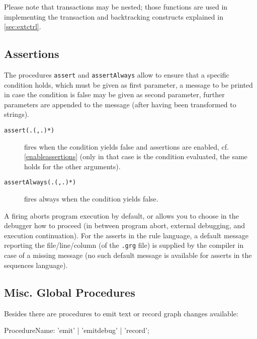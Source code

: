 Please note that transactions may be nested; those functions are used in implementing the transaction and backtracking constructs explained in \ref{sec:extctrl}.


\subsection{Assertions}\label{sec:assert}

The procedures \texttt{assert} and \texttt{assertAlways} allow to ensure that a specific condition holds, which must be given as first parameter, a message to be printed in case the condition is false may be given as second parameter, further parameters are appended to the  message (after having been transformed to strings).

\begin{description}
\item[\texttt{assert(.(,.)*)}] fires when the condition yields false and assertions are enabled, cf. \ref{enableassertions} (only in that case is the condition evaluated, the same holds for the other arguments).
\item[\texttt{assertAlways(.(,.)*)}] fires always when the condition yields false.
\end{description}

A firing aborts program execution by default, or allows you to choose in the debugger how to proceed (in between program abort, external debugging, and execution continuation).
For the asserts in the rule language, a default message reporting the file/line/column (of the \texttt{.grg} file) is supplied by the compiler in case of a missing message (no such default message is available for asserts in the sequences language).


\subsection{Misc. Global Procedures}

Besides there are procedures to emit text or record graph changes available: 

\begin{rail}
  ProcedureName: 'emit' | 'emitdebug' | 'record';
\end{rail}\label{recstmt}

